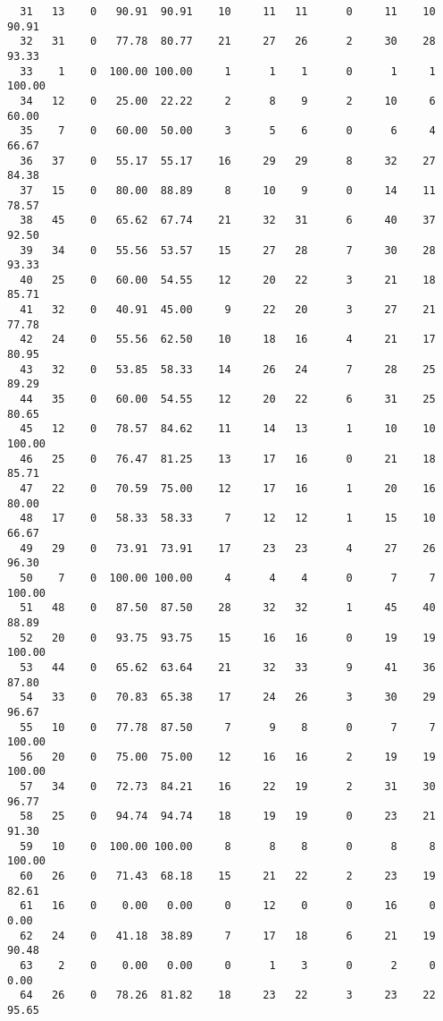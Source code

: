 \begin{verbatim}
  31   13    0   90.91  90.91    10     11   11      0     11    10    90.91
  32   31    0   77.78  80.77    21     27   26      2     30    28    93.33
  33    1    0  100.00 100.00     1      1    1      0      1     1   100.00
  34   12    0   25.00  22.22     2      8    9      2     10     6    60.00
  35    7    0   60.00  50.00     3      5    6      0      6     4    66.67
  36   37    0   55.17  55.17    16     29   29      8     32    27    84.38
  37   15    0   80.00  88.89     8     10    9      0     14    11    78.57
  38   45    0   65.62  67.74    21     32   31      6     40    37    92.50
  39   34    0   55.56  53.57    15     27   28      7     30    28    93.33
  40   25    0   60.00  54.55    12     20   22      3     21    18    85.71
  41   32    0   40.91  45.00     9     22   20      3     27    21    77.78
  42   24    0   55.56  62.50    10     18   16      4     21    17    80.95
  43   32    0   53.85  58.33    14     26   24      7     28    25    89.29
  44   35    0   60.00  54.55    12     20   22      6     31    25    80.65
  45   12    0   78.57  84.62    11     14   13      1     10    10   100.00
  46   25    0   76.47  81.25    13     17   16      0     21    18    85.71
  47   22    0   70.59  75.00    12     17   16      1     20    16    80.00
  48   17    0   58.33  58.33     7     12   12      1     15    10    66.67
  49   29    0   73.91  73.91    17     23   23      4     27    26    96.30
  50    7    0  100.00 100.00     4      4    4      0      7     7   100.00
  51   48    0   87.50  87.50    28     32   32      1     45    40    88.89
  52   20    0   93.75  93.75    15     16   16      0     19    19   100.00
  53   44    0   65.62  63.64    21     32   33      9     41    36    87.80
  54   33    0   70.83  65.38    17     24   26      3     30    29    96.67
  55   10    0   77.78  87.50     7      9    8      0      7     7   100.00
  56   20    0   75.00  75.00    12     16   16      2     19    19   100.00
  57   34    0   72.73  84.21    16     22   19      2     31    30    96.77
  58   25    0   94.74  94.74    18     19   19      0     23    21    91.30
  59   10    0  100.00 100.00     8      8    8      0      8     8   100.00
  60   26    0   71.43  68.18    15     21   22      2     23    19    82.61
  61   16    0    0.00   0.00     0     12    0      0     16     0     0.00
  62   24    0   41.18  38.89     7     17   18      6     21    19    90.48
  63    2    0    0.00   0.00     0      1    3      0      2     0     0.00
  64   26    0   78.26  81.82    18     23   22      3     23    22    95.65

\end{verbatim}
